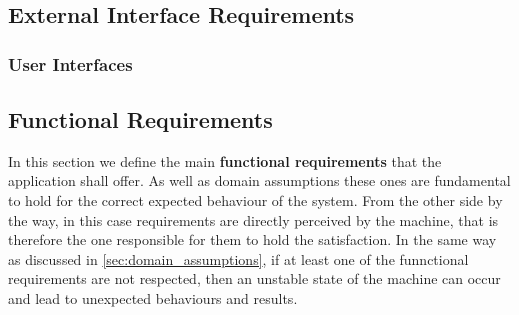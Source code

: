 \subsection{External Interface Requirements}
\subsubsection{User Interfaces}
\vspace{-6mm}


\subsection{Functional Requirements}
In this section we define the main \textbf{functional requirements} that the application shall offer. As well as domain assumptions these ones are fundamental to hold for the correct expected behaviour of the system. From the other side by the way, in this case requirements are directly perceived by the machine, that is therefore the one responsible for them to hold the satisfaction. In the same way as discussed in \ref{sec:domain_assumptions}, if at least one of the funnctional requirements are not respected, then an unstable state of the machine can occur and lead to unexpected behaviours and results.
\newline\newline
{}
\newline\newline
{}
\newline\newline
{}

